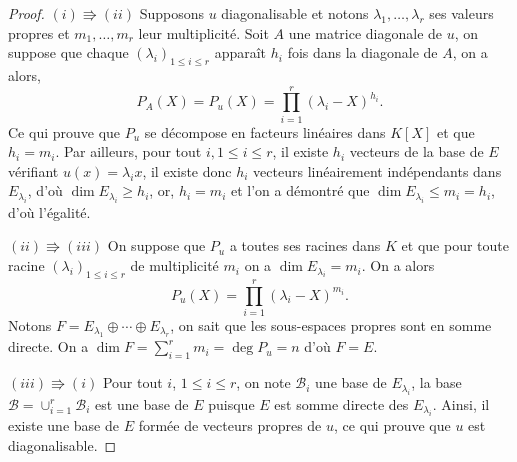 \documentclass[class=report,crop=false]{standalone}
\begin{document}
\begin{proof}
$(i)\Rrightarrow(ii)$ Supposons $u$ diagonalisable et notons $\lambda_1,\dots,\lambda_r$ ses valeurs propres et $m_1,\dots,m_r$ leur multiplicité. Soit $A$ une matrice diagonale de $u$, on suppose que  chaque $(\lambda_i)_{1\leq i\leq r}$ apparaît $h_i$ fois dans la diagonale de $A$, on a alors,
$$P_A(X)=P_u(X)=\prod_{i=1}^r(\lambda_i-X)^{h_i}.$$
Ce qui prouve que $P_u$ se décompose en facteurs linéaires dans $K[X]$ et que $h_i=m_i$. Par ailleurs, pour tout $i, 1\leq i\leq r$, il existe $h_i$ vecteurs de la base de $E$ vérifiant $u(x)=\lambda_ix$, il existe donc $h_i$ vecteurs linéairement indépendants dans $E_{\lambda_i}$, d'où 
$\dim E_{\lambda_i}\geq h_i$, or, $h_i=m_i$ et l'on a démontré que $\dim E_{\lambda_i}\leq m_i=h_i$, d'où l'égalité.

$(ii)\Rrightarrow(iii)$ On suppose que $P_u$ a toutes ses racines dans $K$ et que pour toute racine $(\lambda_i)_{1\leq i\leq r}$ de multiplicité $m_i$ on a $\dim E_{\lambda_i}=m_i$. On a alors
$$P_u(X)=\prod_{i=1}^r(\lambda_i-X)^{m_i}.$$
Notons $F=E_{\lambda_1}\oplus\cdots\oplus E_{\lambda_r}$, on sait que les sous-espaces propres sont en somme directe. On a $\dim F=\sum_{i=1}^r m_i=\deg P_u=n$ d'où $F=E$.

$(iii)\Rrightarrow(i)$ Pour tout $i$, $1\leq i\leq r$, on note $\mathcal{B}_i$ une base de $E_{\lambda_i}$, la base $\mathcal{B}=\cup_{i=1}^r\mathcal{B}_i$ est une base de $E$ puisque $E$ est somme directe des $E_{\lambda_i}$. Ainsi, il existe une base de $E$ formée de vecteurs propres de $u$, ce qui prouve que $u$ est diagonalisable.  

\end{proof}
\end{document}

